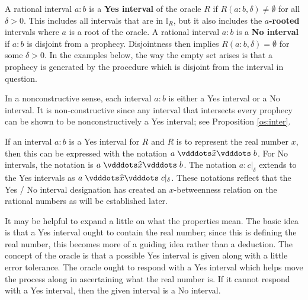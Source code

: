 \documentclass[12pt]{article}
\begin{document}
A rational interval $a:b$ is a \textbf{Yes interval} of the oracle $R$ if $R(a:b, \delta) \neq \emptyset$ for all $\delta >0$. This includes all intervals that are in  $\mathbb{I}_R$, but it also includes the \textbf{$a$-rooted} intervals where $a$ is a root of the oracle.   A rational interval $a:b$ is a \textbf{No interval} if $a:b$ is disjoint from a prophecy. Disjointness then implies $R(a:b, \delta) = \emptyset$ for some $\delta > 0$. In the examples below, the way the empty set arises is that a prophecy is generated by the procedure which is disjoint from the interval in question. 

In a nonconstructive sense, each interval $a:b$ is either a Yes interval or a No interval. It is non-constructive since any interval that intersects every prophecy can be shown to be nonconstructively a Yes interval; see Proposition \ref{os:inter}. 

If an interval $a:b$ is a Yes interval for $R$ and $R$ is to represent the real number $x$, then this can be expressed with the notation $a \xora b$. For No intervals, the notation is \sout{$a \xora b$}. The notation $a:c|_\delta$ extends to the Yes intervals as $a \xora c|_\delta$. These notations reflect that the Yes / No interval designation has created an $x$-betweenness relation on the rational numbers as will be established later.

It may be helpful to expand a little on what the properties mean. The basic idea is that a Yes interval ought to contain the real number; since this is defining the real number, this becomes more of a guiding idea rather than a deduction. The concept of the oracle is that a possible Yes interval is given along with a little error tolerance. The oracle ought to respond with a Yes interval which helps move the process along in ascertaining what the real number is. If it cannot respond with a Yes interval, then the given interval is a No interval. 
\end{document}
